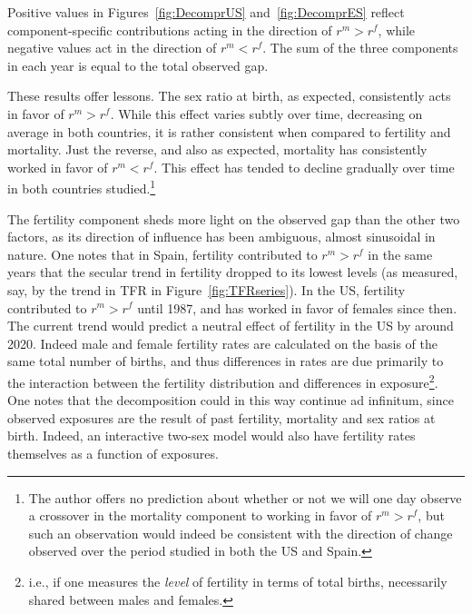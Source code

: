 Positive values in Figures~\ref{fig:DecomprUS} and~\ref{fig:DecomprES} reflect
component-specific contributions acting in the direction of $r^m > r^f$, while
negative values act in the direction of $r^m < r^f$. The sum of the three
components in each year is equal to the total observed gap. 

These results offer lessons. The sex ratio at birth, as
expected, consistently acts in favor of $r^m > r^f$. While this effect varies
subtly over time, decreasing on average in both countries, it is rather
consistent when compared to fertility and mortality. Just the reverse, and 
also as expected, mortality has consistently worked in
favor of $r^m < r^f$. This effect has tended to decline gradually over time in
both countries studied.\footnote{The author offers no prediction about whether
or not we will one day observe a crossover in the mortality component to working
in favor of $r^m > r^f$, but such an observation would indeed be consistent
with the direction of change observed over the period studied in both the US
and Spain.} 

The fertility component sheds more light on the observed gap than
the other two factors, as its direction of influence has been ambiguous, almost
sinusoidal in nature. One notes that in Spain, fertility
contributed to $r^m > r^f$ in the same years that the secular trend in fertility
dropped to its lowest levels (as measured, say, by the trend
in TFR in Figure~\ref{fig:TFRseries}). In the US, fertility contributed to $r^m
> r^f$ until 1987, and has worked in favor of females since then. The current
trend would predict a neutral effect of fertility in the US by around 2020.
Indeed male and female fertility rates are calculated on the basis of the same
total number of births, and thus differences in rates are due primarily to the
interaction between the fertility distribution and differences in
exposure\footnote{i.e., if one measures the \textit{level} of fertility in
terms of total births, necessarily shared between males and females.}. One notes
that the decomposition could in this way continue ad infinitum, since 
observed exposures are the result of past fertility, mortality and sex
 ratios at birth. Indeed, an interactive two-sex model would also have fertility rates
themselves as a function of exposures.

